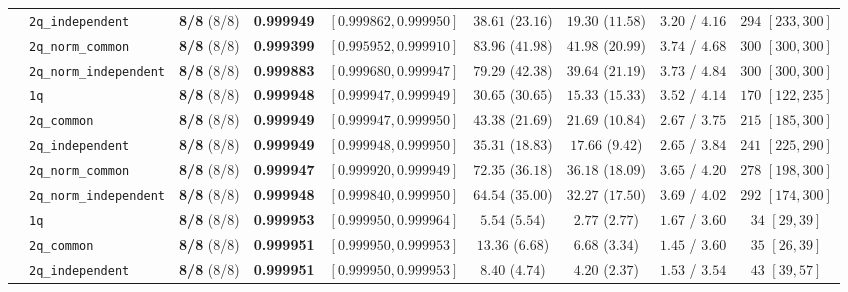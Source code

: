 \documentclass[10pt,a4paper]{article}
\begin{document}
\begin{table}[h!]
{\begin{tabular}{llccccccc}
  & \texttt{2q\_independent} & \textbf{8/8} (8/8) & \textbf{0.999949} & $[0.999862, 0.999950]$ & $38.61$ ($23.16$) & $19.30$ ($11.58$) & $3.20$ / $4.16$ & $294$ $[233, 300]$ \\
  & \texttt{2q\_norm\_common} & \textbf{8/8} (8/8) & \textbf{0.999399} & $[0.995952, 0.999910]$ & $83.96$ ($41.98$) & $41.98$ ($20.99$) & $3.74$ / $4.68$ & $300$ $[300, 300]$ \\
  & \texttt{2q\_norm\_independent} & \textbf{8/8} (8/8) & \textbf{0.999883} & $[0.999680, 0.999947]$ & $79.29$ ($42.38$) & $39.64$ ($21.19$) & $3.73$ / $4.84$ & $300$ $[300, 300]$ \\
\midrule
  & \texttt{1q} & \textbf{8/8} (8/8) & \textbf{0.999948} & $[0.999947, 0.999949]$ & $30.65$ ($30.65$) & $15.33$ ($15.33$) & $3.52$ / $4.14$ & $170$ $[122, 235]$ \\
  & \texttt{2q\_common} & \textbf{8/8} (8/8) & \textbf{0.999949} & $[0.999947, 0.999950]$ & $43.38$ ($21.69$) & $21.69$ ($10.84$) & $2.67$ / $3.75$ & $215$ $[185, 300]$ \\
  & \texttt{2q\_independent} & \textbf{8/8} (8/8) & \textbf{0.999949} & $[0.999948, 0.999950]$ & $35.31$ ($18.83$) & $17.66$ ($9.42$) & $2.65$ / $3.84$ & $241$ $[225, 290]$ \\
  & \texttt{2q\_norm\_common} & \textbf{8/8} (8/8) & \textbf{0.999947} & $[0.999920, 0.999949]$ & $72.35$ ($36.18$) & $36.18$ ($18.09$) & $3.65$ / $4.20$ & $278$ $[198, 300]$ \\
  & \texttt{2q\_norm\_independent} & \textbf{8/8} (8/8) & \textbf{0.999948} & $[0.999840, 0.999950]$ & $64.54$ ($35.00$) & $32.27$ ($17.50$) & $3.69$ / $4.02$ & $292$ $[174, 300]$ \\
\midrule
  & \texttt{1q} & \textbf{8/8} (8/8) & \textbf{0.999953} & $[0.999950, 0.999964]$ & $5.54$ ($5.54$) & $2.77$ ($2.77$) & $1.67$ / $3.60$ & $34$ $[29, 39]$ \\
  & \texttt{2q\_common} & \textbf{8/8} (8/8) & \textbf{0.999951} & $[0.999950, 0.999953]$ & $13.36$ ($6.68$) & $6.68$ ($3.34$) & $1.45$ / $3.60$ & $35$ $[26, 39]$ \\
  & \texttt{2q\_independent} & \textbf{8/8} (8/8) & \textbf{0.999951} & $[0.999950, 0.999953]$ & $8.40$ ($4.74$) & $4.20$ ($2.37$) & $1.53$ / $3.54$ & $43$ $[39, 57]$ \\

\end{tabular}}
\end{table}
\end{document}
